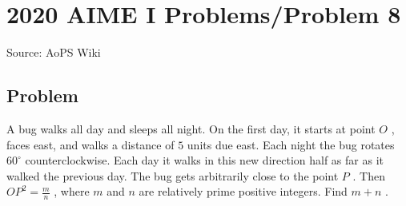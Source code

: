 \documentclass[12pt]{article}
\begin{document}
\section*{{2020 AIME I Problems/Problem 8}}
Source: AoPS Wiki

\subsection*{Problem}
A bug walks all day and sleeps all night. On the first day, it starts at point $O$ , faces east, and walks a distance of $5$ units due east. Each night the bug rotates $60^\circ$ counterclockwise. Each day it walks in this new direction half as far as it walked the previous day. The bug gets arbitrarily close to the point $P$ . Then $OP^2=\tfrac{m}{n}$ , where $m$ and $n$ are relatively prime positive integers. Find $m+n$ .
\end{document}
